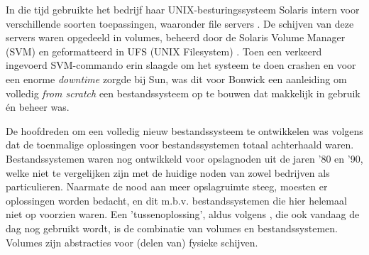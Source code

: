 In die tijd gebruikte het bedrijf haar UNIX-besturingssysteem Solaris intern voor verschillende soorten toepassingen, waaronder file servers \autocite{Bonwick2015}. De schijven van deze servers waren opgedeeld in volumes, beheerd door de Solaris Volume Manager (SVM) en geformatteerd in UFS (UNIX Filesystem) \autocite{Bonwick2015}. Toen een verkeerd ingevoerd SVM-commando erin slaagde om het systeem te doen crashen en voor een enorme \textit{downtime} zorgde bij  Sun, was dit voor Bonwick een aanleiding om volledig \textit{from scratch} een bestandssysteem op te bouwen dat makkelijk in gebruik én beheer was.

De hoofdreden om een volledig nieuw bestandssysteem te ontwikkelen was volgens \textcite{JeffBonwick_lastZFS} dat de toenmalige oplossingen voor bestandssystemen totaal achterhaald waren. Bestandssystemen waren nog ontwikkeld voor opslagnoden uit de jaren '80 en '90, welke niet te vergelijken zijn met de huidige noden van zowel bedrijven als particulieren. Naarmate de nood aan meer opslagruimte steeg, moesten er oplossingen worden bedacht, en dit m.b.v. bestandssystemen die hier helemaal niet op voorzien waren. Een 'tussenoplossing', aldus volgens \textcite{JeffBonwick_lastZFS}, die ook vandaag de dag nog gebruikt wordt, is de combinatie van volumes en bestandssystemen. Volumes zijn abstracties voor (delen van) fysieke schijven.



